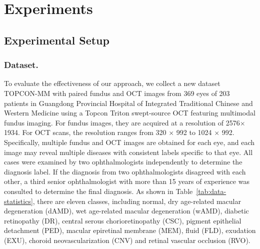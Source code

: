 \documentclass[runningheads]{llncs}
\begin{document}


\section{Experiments}
\label{sec:experiments}
\subsection{Experimental Setup}
\subsubsection{Dataset.}

To evaluate the effectiveness of our approach, we collect a new dataset TOPCON-MM with paired fundus and OCT images from 369 eyes of 203 patients in Guangdong Provincial Hospital of Integrated Traditional Chinese and Western Medicine using a Topcon Triton swept-source OCT featuring multimodal fundus imaging. 
For fundus images, they are acquired at a resolution of 2576$\times$1934. For OCT scans, the resolution ranges from 320 $\times$ 992 to 1024 $\times$ 992. 
Specifically, multiple fundus and OCT images are obtained for each eye, and each image may reveal multiple diseases with consistent labels specific to that eye. All cases were examined by two ophthalmologists independently to determine the diagnosis label.
If the diagnosis from two ophthalmologists disagreed with each other, a third senior ophthalmologist with more than 15 years of experience was consulted to determine the final diagnosis.
As shown in Table~\ref{tab:data-statistics}, there are eleven classes, including  normal, dry age-related macular degeneration (dAMD), wet age-related macular degeneration (wAMD), diabetic retinopathy (DR), central serous chorioretinopathy (CSC), pigment epithelial detachment (PED), macular epiretinal membrane (MEM), fluid (FLD), exudation (EXU), choroid neovascularization (CNV) and retinal vascular occlusion (RVO). 


\end{document}
